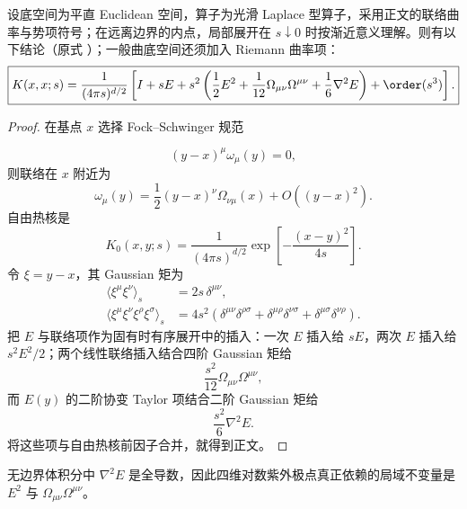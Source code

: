 \begin{proposition}
设底空间为平直 Euclidean 空间，算子为光滑 Laplace 型算子，采用正文的联络曲率与势项符号；在远离边界的内点，局部展开在 $s\downarrow0$ 时按渐近意义理解。则有以下结论（原式 ）；一般曲底空间还须加入 Riemann 曲率项：
\begin{equation*}
 \boxed{
 K(x,x;s)
 =\frac1{(4\pi s)^{d/2}}
 \left[
 I+sE+s^2\left(
 \frac12E^2+\frac1{12}\Omega_{\mu\nu}\Omega^{\mu\nu}
 +\frac16\nabla^2E
 \right)+\order(s^3)
 \right].}
\end{equation*}
\end{proposition}
\begin{proof}
在基点 $x$ 选择 Fock--Schwinger 规范

\begin{equation*}
 (y-x)^\mu\omega_\mu(y)=0,
\end{equation*}
则联络在 $x$ 附近为
\begin{equation*}
 \omega_\mu(y)
 =\frac12(y-x)^\nu\Omega_{\nu\mu}(x)
 +O((y-x)^2).
\end{equation*}
自由热核是
\begin{equation*}
 K_0(x,y;s)=\frac1{(4\pi s)^{d/2}}
 \exp\!\left[-\frac{(x-y)^2}{4s}\right].
\end{equation*}
令 $\xi=y-x$，其 Gaussian 矩为
\begin{align*}
 \langle\xi^\mu\xi^\nu\rangle_s
 &=2s\,\delta^{\mu\nu},\\
 \langle\xi^\mu\xi^\nu\xi^\rho\xi^\sigma\rangle_s
 &=4s^2(\delta^{\mu\nu}\delta^{\rho\sigma}
 +\delta^{\mu\rho}\delta^{\nu\sigma}
 +\delta^{\mu\sigma}\delta^{\nu\rho}).
\end{align*}
把 $E$ 与联络项作为固有时有序展开中的插入：一次 $E$ 插入给 $sE$，两次 $E$ 插入给 $s^2E^2/2$；两个线性联络插入结合四阶 Gaussian 矩给
\begin{equation*}
 \frac{s^2}{12}\Omega_{\mu\nu}\Omega^{\mu\nu},
\end{equation*}
而 $E(y)$ 的二阶协变 Taylor 项结合二阶 Gaussian 矩给
\begin{equation*}
 \frac{s^2}{6}\nabla^2E.
\end{equation*}
将这些项与自由热核前因子合并，就得到正文。
\end{proof}

无边界体积分中 \(\nabla^2E\) 是全导数，因此四维对数紫外极点真正依赖的局域不变量是 \(E^2\) 与 \(\Omega_{\mu\nu}\Omega^{\mu\nu}\)。

